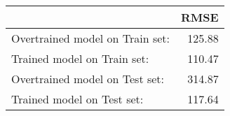 \begin{tabular}{lr}
\toprule
{} & RMSE\\
\midrule
Overtrained model on Train set: & 125.88 \\
Trained model on Train set: & 110.47 \\
Overtrained model on Test set: & 314.87 \\
Trained model on Test set:  & 117.64 \\

\bottomrule
\end{tabular}


